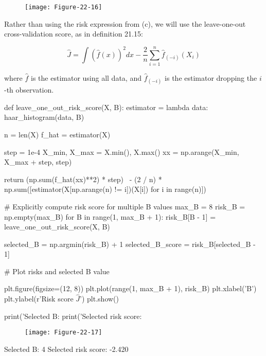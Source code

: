 \begin{figure}[H]
\texttt{[image: Figure-22-16]}
\end{figure}

Rather than using the risk expression from (c), we will use the
leave-one-out cross-validation score, as in definition 21.15:

\[ \hat{J} = \int \left( \hat{f}(x) \right)^2 dx - \frac{2}{n} \sum_{i=1}^n \hat{f}_{(-i)} (X_i) \]

where \(\hat{f}\) is the estimator using all data, and
\(\hat{f}_{(-i)}\) is the estimator dropping the \(i\)-th observation.


\begin{python}
def leave_one_out_risk_score(X, B):
    estimator = lambda data: haar_histogram(data, B)
    
    n = len(X)
    f_hat = estimator(X)
    
    step = 1e-4
    X_min, X_max = X.min(), X.max()
    xx = np.arange(X_min, X_max + step, step)

    return (np.sum(f_hat(xx)**2) * step) \
        - (2 / n) * np.sum([estimator(X[np.arange(n) != i])(X[i]) for i in range(n)])
\end{python}

\begin{python}
# Explicitly compute risk score for multiple B values
max_B = 8
risk_B = np.empty(max_B)
for B in range(1, max_B + 1):
    risk_B[B - 1] = leave_one_out_risk_score(X, B)

selected_B = np.argmin(risk_B) + 1
selected_B_score = risk_B[selected_B - 1]
\end{python}

\begin{python}
# Plot risks and selected B value

plt.figure(figsize=(12, 8))
plt.plot(range(1, max_B + 1), risk_B)
plt.xlabel('B')
plt.ylabel(r'Risk score $\hat{J}$')
plt.show()

print('Selected B: %
print('Selected risk score: %
\end{python}

\begin{figure}[H]
\texttt{[image: Figure-22-17]}
\end{figure}

\begin{console}
Selected B: 4
Selected risk score: -2.420
\end{console}

